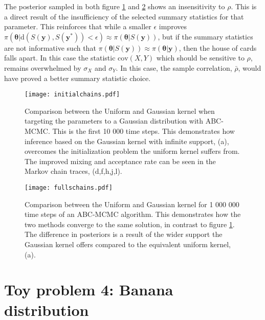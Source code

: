 The posterior sampled in both figure \ref{KuVSKg-1} and \ref{KuVSKg-2} shows an insensitivity to $\rho$. This is a direct result of the insufficiency of the selected summary statistics for that parameter. This reinforces that while a smaller $\epsilon$ improves $\pi(\bm{\theta}|\text{d}(S(\bm{y}),S(\bm{y^*}))<\epsilon) \approx \pi(\bm{\theta}|S(\bm{y}))$, but if the summary statistics are not informative such that $\pi(\bm{\theta}|S(\bm{y})) \approx \pi(\bm{\theta}|\bm{y})$, then the house of cards falls apart. In this case the statistic $\text{cov}(X,Y)$ which should be sensitive to $\rho$, remains overwhelmed by $\sigma_X$ and $\sigma_Y$. In this case, the sample correlation, $\bar{\rho}$, would have proved a better summary statistic choice. 

\begin{figure}[H]
	\centering
	\texttt{[image: initialchains.pdf]}
	\caption{Comparison between the Uniform and Gaussian kernel when targeting the parameters to a Gaussian distribution with ABC-MCMC. This is the first 10 000 time steps. This demonstrates how inference based on the Gaussian kernel with infinite support, (a), overcomes the initialization problem the uniform kernel suffers from. The improved mixing and acceptance rate can be seen in the Markov chain traces, (d,f,h,j,l).}
	\label{KuVSKg-1}
\end{figure}

\begin{figure}[H]
	\centering
	\texttt{[image: fullschains.pdf]}
	\caption{Comparison between the Uniform and Gaussian kernel for 1 000 000 time steps of an ABC-MCMC algorithm. This demonstrates how the two methods converge to the same solution, in contrast to figure \ref{KuVSKg-1}. The difference in posteriors is a result of the wider support the Gaussian kernel offers compared to the equivalent uniform kernel, (a).}
	\label{KuVSKg-2}
\end{figure} 

\section{Toy problem 4: Banana distribution}

